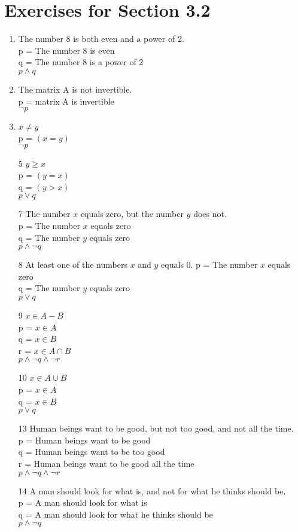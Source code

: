 \documentclass[12pt]{article}
\begin{document}
\section*{Exercises for Section 3.2}
\begin{enumerate}
	\item The number 8 is both even and a power of 2.\\
	    p = The number 8 is even\\
	    q = The number 8 is a power of 2\\
	    $p\land q$
	\item The matrix A is not invertible.\\
	    p = matrix A is invertible\\
	    $\neg p$
	\item $x\neq y$\\
	    p = $(x=y)$\\
	    $\neg p$
	\item[5] $y\ge x$\\
	    p = $(y=x)$\\
	    q = $(y>x)$\\
	    $p \lor q$
	\item[7] The number $x$ equals zero, but the number $y$ does not.\\
	    p = The number $x$ equals zero\\
	    q = The number $y$ equals zero\\
	    $p \land \neg q$
	\item[8] At least one of the numbers $x$ and $y$ equals $0$.
	    p = The number $x$ equals zero\\
	    q = The number $y$ equals zero\\
	    $p \lor q$
	\item[9] $x\in A-B$\\
	    p = $x\in A$\\
	    q = $x\in B$\\
	    r = $x\in A\cap B$\\
	    $p \land \neg q \land \neg r$
	\item[10] $x\in A\cup B$\\
	    p = $x\in A$\\
	    q = $x\in B$\\
	    $p \lor q$
	\item[13] Human beings want to be good, but not too good, and not all the time.\\
	    p = Human beings want to be good\\
	    q = Human beings want to be too good\\
	    r = Human beings want to be good all the time\\
	    $p \land \neg q \land \neg r$
	\item[14] A man should look for what is, and not for what he thinks should be.\\
	    p = A man should look for what is\\
	    q = A man should look for what he thinks should be\\
	    $p \land \neg q$
\end{enumerate}
\end{document}
